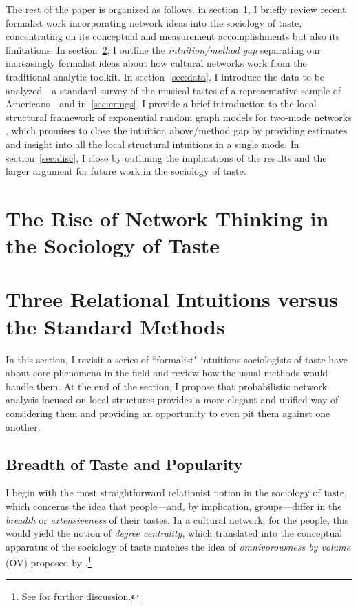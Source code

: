 \documentclass[preprint,12pt,authoryear]{elsarticle}
\begin{document}
The rest of the paper is organized as follows. in section~\ref{sec:networks}, I briefly review recent formalist work incorporating network ideas into the sociology of taste, concentrating on its conceptual and measurement accomplishments but also its limitations. In section~\ref{sec:localstruct}, I outline the \textit{intuition/method gap} separating our increasingly formalist ideas about how cultural networks work from the traditional analytic toolkit. In section~\ref{sec:data}, I introduce the data to be analyzed---a standard survey of the musical tastes of a representative sample of Americans---and in~\ref{sec:ermgs}, I provide a brief introduction to the local structural framework of exponential random graph models for two-mode networks \citep{pattison2002neighborhood}, which promises to close the intuition above/method gap by providing estimates and insight into all the local structural intuitions in a single mode. In section~\ref{sec:disc}, I close by outlining the implications of the results and the larger argument for future work in the sociology of taste. 

\section{The Rise of Network Thinking in the Sociology of Taste}
\label{sec:networks}

\section{Three Relational Intuitions versus the Standard Methods}
\label{sec:localstruct}

In this section, I revisit a series of ``formalist" intuitions sociologists of taste have about core phenomena in the field and review how the usual methods would handle them. At the end of the section, I propose that probabilistic network analysis focused on local structures provides a more elegant and unified way of considering them and providing an opportunity to even pit them against one another. 

\subsection{Breadth of Taste and Popularity}
I begin with the most straightforward relationist notion in the sociology of taste, which concerns the idea that people---and, by implication, groups---differ in the \textit{breadth} or \textit{extensiveness} of their tastes. In a cultural network, for the people, this would yield the notion of \textit{degree centrality}, which translated into the conceptual apparatus of the sociology of taste matches the idea of \textit{omnivorousness by volume} (OV) proposed by \citet{warde2009anatomy}.\footnote{See \citet{lizardo2014omnivorousness} for further discussion.}
\end{document}
